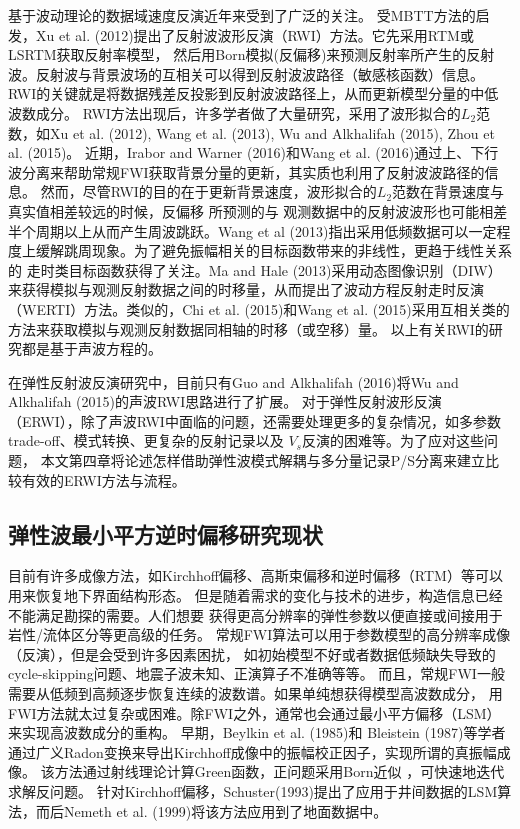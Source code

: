 基于波动理论的数据域速度反演近年来受到了广泛的关注。
受MBTT方法的启发，Xu et al. (2012)\cite{xu:2012}提出了反射波波形反演（RWI）方法。它先采用RTM或LSRTM获取反射率模型，
然后用Born模拟(反偏移)来预测反射率所产生的反射波。反射波与背景波场的互相关可以得到反射波波路径（敏感核函数）信息。
RWI的关键就是将数据残差反投影到反射波波路径上，从而更新模型分量的中低波数成分。
RWI方法出现后，许多学者做了大量研究，采用了波形拟合的$L_2$范数，如Xu
et al. (2012)\cite{xu:2012}, Wang et al. (2013)\cite{Wang2013}, Wu and
Alkhalifah (2015)\cite{Wu2015b},
Zhou et
al. (2015)\cite{zhou:2015}。
近期，Irabor and
Warner (2016)\cite{Irabor2016}和Wang et al.
(2016)\cite{WangFangEtAl2016}通过上、下行波分离来帮助常规FWI获取背景分量的更新，其实质也利用了反射波波路径的信息。
然而，尽管RWI的目的在于更新背景速度，波形拟合的$L_2$范数在背景速度与真实值相差较远的时候，反偏移
所预测的与
观测数据中的反射波波形也可能相差半个周期以上从而产生周波跳跃。Wang et
al
(2013)\cite{Wang2013}指出采用低频数据可以一定程度上缓解跳周现象。为了避免振幅相关的目标函数带来的非线性，更趋于线性关系的
走时类目标函数获得了关注。Ma and
Hale
(2013)\cite{ma2013}采用动态图像识别（DIW）来获得模拟与观测反射数据之间的时移量，从而提出了波动方程反射走时反演（WERTI）方法。类似的，Chi
et al. (2015)\cite{chi2015}和Wang et al.
(2015)\cite{Wang2015}采用互相关类的方法来获取模拟与观测反射数据同相轴的时移（或空移）量。
以上有关RWI的研究都是基于声波方程的。

在弹性反射波反演研究中，目前只有Guo and
Alkhalifah (2016)\cite{Guo2016}将Wu and
Alkhalifah (2015)\cite{Wu2015b}的声波RWI思路进行了扩展。
对于弹性反射波形反演（ERWI），除了声波RWI中面临的问题，还需要处理更多的复杂情况，如多参数trade-off、模式转换、更复杂的反射记录以及
$V_s$反演的困难等。为了应对这些问题，
本文第四章将论述怎样借助弹性波模式解耦与多分量记录P/S分离来建立比较有效的ERWI方法与流程。

\subsection{弹性波最小平方逆时偏移研究现状}

目前有许多成像方法，如Kirchhoff偏移、高斯束偏移和逆时偏移（RTM）等可以用来恢复地下界面结构形态。
但是随着需求的变化与技术的进步，构造信息已经不能满足勘探的需要。人们想要
获得更高分辨率的弹性参数以便直接或间接用于岩性/流体区分等更高级的任务。
常规FWI算法可以用于参数模型的高分辨率成像（反演），但是会受到许多因素困扰，
如初始模型不好或者数据低频缺失导致的cycle-skipping问题、地震子波未知、正演算子不准确等等。
而且，常规FWI一般需要从低频到高频逐步恢复连续的波数谱。如果单纯想获得模型高波数成分，
用FWI方法就太过复杂或困难。除FWI之外，通常也会通过最小平方偏移（LSM）来实现高波数成分的重构。
早期，Beylkin
et al. (1985)\cite{BeylkinEtAl1985}和
Bleistein (1987)\cite{Bleistein1987}等学者通过广义Radon变换来导出Kirchhoff成像中的振幅校正因子，实现所谓的真振幅成像。
该方法通过射线理论计算Green函数，正问题采用Born近似
，可快速地迭代求解反问题。
针对Kirchhoff偏移，Schuster(1993)\cite{Schuster1993}提出了应用于井间数据的LSM算法，而后Nemeth et al.
(1999)\cite{Nemeth1999}将该方法应用到了地面数据中。

